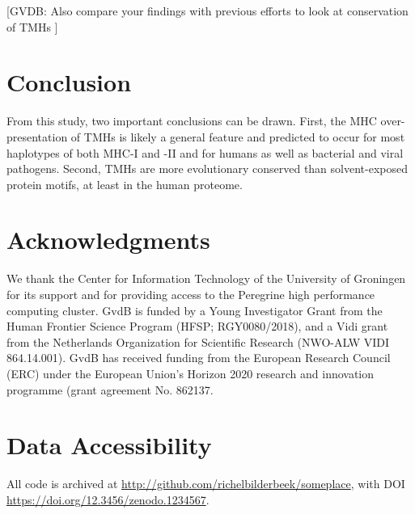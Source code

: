 [GVDB: 
  Also compare your findings with previous efforts 
  to look at conservation of TMHs
]

\section{Conclusion}


From this study, two important conclusions can be drawn. 
First, the MHC over-presentation of TMHs is likely a general feature 
and predicted to occur for most haplotypes of both MHC-I and -II 
and for humans as well as bacterial and viral pathogens. 
Second, TMHs are more evolutionary conserved than solvent-exposed protein motifs, 
at least in the human proteome. 

\section{Acknowledgments}

We thank the Center for Information Technology of the University 
of Groningen for its support and for providing access to the Peregrine 
high performance computing cluster. GvdB is funded by a Young Investigator Grant from the Human Frontier Science Program (HFSP; RGY0080/2018), and a Vidi grant from the Netherlands Organization for Scientific Research (NWO-ALW VIDI 864.14.001). GvdB has received funding from the European Research Council (ERC) under the European Union’s Horizon 2020 research and innovation programme (grant agreement No. 862137. 

\section{Data Accessibility}

All code is archived at \url{http://github.com/richelbilderbeek/someplace},
with DOI \url{https://doi.org/12.3456/zenodo.1234567}.

